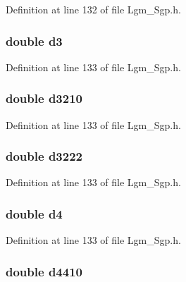 Definition at line 132 of file Lgm\_\-Sgp.h.\hypertarget{struct___sgp_info_483620916658141a26a261c7a5016910}{
\subsubsection[{d3}]{\setlength{\rightskip}{0pt plus 5cm}double {\bf d3}}}
\label{struct___sgp_info_483620916658141a26a261c7a5016910}




Definition at line 133 of file Lgm\_\-Sgp.h.\hypertarget{struct___sgp_info_a7e79e7ab67d28da1b1b3dac80810655}{
\subsubsection[{d3210}]{\setlength{\rightskip}{0pt plus 5cm}double {\bf d3210}}}
\label{struct___sgp_info_a7e79e7ab67d28da1b1b3dac80810655}




Definition at line 133 of file Lgm\_\-Sgp.h.\hypertarget{struct___sgp_info_01655415f454f2f669b0055791fdd7fb}{
\subsubsection[{d3222}]{\setlength{\rightskip}{0pt plus 5cm}double {\bf d3222}}}
\label{struct___sgp_info_01655415f454f2f669b0055791fdd7fb}




Definition at line 133 of file Lgm\_\-Sgp.h.\hypertarget{struct___sgp_info_4bdca1913dad0bca307e04c2c8128100}{
\subsubsection[{d4}]{\setlength{\rightskip}{0pt plus 5cm}double {\bf d4}}}
\label{struct___sgp_info_4bdca1913dad0bca307e04c2c8128100}




Definition at line 133 of file Lgm\_\-Sgp.h.\hypertarget{struct___sgp_info_0b8afbe4b3eaca5ad5d895e7e6bb0da3}{
\subsubsection[{d4410}]{\setlength{\rightskip}{0pt plus 5cm}double {\bf d4410}}}
\label{struct___sgp_info_0b8afbe4b3eaca5ad5d895e7e6bb0da3}




